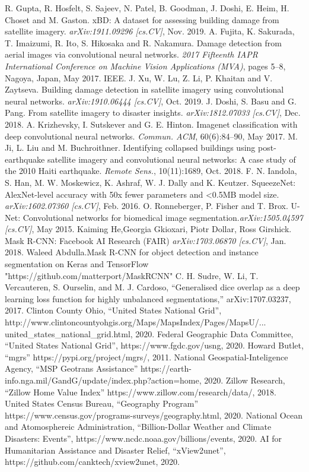 \documentclass[conference]{IEEEtran}
\begin{document}
\begin{thebibliography}{00}
 R. Gupta, R. Hosfelt, S. Sajeev, N. Patel, B. Goodman, J. Doshi, E. Heim, H. Choset and M. Gaston. xBD: A dataset for assessing building damage from satellite imagery. \emph{arXiv:1911.09296 [cs.CV]}, Nov. 2019.
A. Fujita, K. Sakurada, T. Imaizumi, R. Ito, S. Hikosaka and R. Nakamura. Damage detection from aerial images via convolutional neural networks. \emph{2017 Fifteenth IAPR International Conference on Machine Vision Applications (MVA)}, pages 5--8, Nagoya, Japan, May 2017. IEEE.
 J. Xu, W. Lu, Z. Li, P. Khaitan and V. Zaytseva. Building damage detection in satellite imagery using convolutional neural networks. \emph{arXiv:1910.06444 [cs.CV]}, Oct. 2019.
 J. Doshi, S. Basu and G. Pang. From satellite imagery to disaster insights. \emph{arXiv:1812.07033 [cs.CV]}, Dec. 2018.
 A. Krizhevsky, I. Sutskever and G. E. Hinton. Imagenet classification with deep convolutional neural networks. \emph{Commun. ACM}, 60(6):84–90, May 2017.
 M. Ji, L. Liu and M. Buchroithner. Identifying collapsed buildings using post-earthquake satellite imagery and convolutional neural networks: A case study of the 2010 Haiti earthquake. \emph{Remote Sens.}, 10(11):1689, Oct. 2018.
 F. N. Iandola, S. Han, M. W. Moskewicz, K. Ashraf, W. J. Dally and K. Keutzer. SqueezeNet: AlexNet-level accuracy with 50x fewer parameters and \textless0.5MB model size. \emph{arXiv:1602.07360 [cs.CV]}, Feb. 2016.
 O. Ronneberger, P. Fisher and T. Brox. U-Net: Convolutional networks for biomedical image segmentation.\emph{arXiv:1505.04597 [cs.CV]}, May 2015.
 Kaiming He,Georgia Gkioxari, Piotr Dollar, Ross Girshick. Mask R-CNN: Facebook AI Research (FAIR) \emph{arXiv:1703.06870 [cs.CV]}, Jan. 2018.
 Waleed Abdulla.Mask R-CNN for object detection and instance segmentation on Keras and TensorFlow "https://github.com/matterport/MaskRCNN"
 C. H. Sudre, W. Li, T. Vercauteren, S. Ourselin, and M. J. Cardoso, “Generalised dice overlap as a deep learning loss function for highly
unbalanced segmentations,” arXiv:1707.03237, 2017.
 Clinton County Ohio, “United States National Grid”, http://www.clintoncountyohgis.org/Maps/MapsIndex/Pages/MapsU/...
united\_states\_national\_grid.html, 2020.
 Federal Geographic Data Committee, “United States National Grid”, https://www.fgdc.gov/usng, 2020.
 Howard Butlet, “mgrs” https://pypi.org/project/mgrs/, 2011.
 National Geospatial-Inteligence Agency, “MSP Geotrans Assistance” https://earth-info.nga.mil/GandG/update/index.php?action=home, 2020.
 Zillow Research, “Zillow Home Value Index” https://www.zillow.com/research/data/, 2018.
 United States Census Bureau, “Geography Program” https://www.census.gov/programs-surveys/geography.html, 2020.
 National Ocean and Atomosphereic Administration, “Billion-Dollar Weather and Climate Disasters: Events”, https://www.ncdc.noaa.gov/billions/events, 2020.
 AI for Humanitarian Assistance and Disaster Relief, “xView2unet”, https://github.com/canktech/xview2unet, 2020.

\end{thebibliography}
\end{document}
